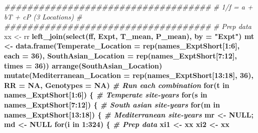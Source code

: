 \documentclass[
]{article}
\newenvironment{Shaded}{\begin{snugshade}}{\end{snugshade}}
\newcommand{\CommentTok}[1]{\textcolor[rgb]{0.56,0.35,0.01}{\textit{#1}}}
\newcommand{\ControlFlowTok}[1]{\textcolor[rgb]{0.13,0.29,0.53}{\textbf{#1}}}
\newcommand{\DataTypeTok}[1]{\textcolor[rgb]{0.13,0.29,0.53}{#1}}
\newcommand{\DecValTok}[1]{\textcolor[rgb]{0.00,0.00,0.81}{#1}}
\newcommand{\KeywordTok}[1]{\textcolor[rgb]{0.13,0.29,0.53}{\textbf{#1}}}
\newcommand{\NormalTok}[1]{#1}
\newcommand{\OperatorTok}[1]{\textcolor[rgb]{0.81,0.36,0.00}{\textbf{#1}}}
\newcommand{\OtherTok}[1]{\textcolor[rgb]{0.56,0.35,0.01}{#1}}
\newcommand{\StringTok}[1]{\textcolor[rgb]{0.31,0.60,0.02}{#1}}
\begin{document}
\begin{Shaded}
\begin{Highlighting}[]
\CommentTok{####################################}
\CommentTok{# 1/f = a + bT + cP (3 Locations) #}
\CommentTok{####################################}
\CommentTok{# Prep data}
\NormalTok{xx <-}\StringTok{ }\NormalTok{rr }\OperatorTok{%
\StringTok{  }\KeywordTok{left_join}\NormalTok{(}\KeywordTok{select}\NormalTok{(ff, Expt, T_mean, P_mean), }\DataTypeTok{by =} \StringTok{"Expt"}\NormalTok{)}
\NormalTok{mt <-}\StringTok{ }\KeywordTok{data.frame}\NormalTok{(}\DataTypeTok{Temperate_Location     =} \KeywordTok{rep}\NormalTok{(names_ExptShort[}\DecValTok{1}\OperatorTok{:}\DecValTok{6}\NormalTok{],  }\DataTypeTok{each =} \DecValTok{36}\NormalTok{),}
                 \DataTypeTok{SouthAsian_Location    =} \KeywordTok{rep}\NormalTok{(names_ExptShort[}\DecValTok{7}\OperatorTok{:}\DecValTok{12}\NormalTok{], }\DataTypeTok{times =} \DecValTok{36}\NormalTok{)) }\OperatorTok{%
\StringTok{  }\KeywordTok{arrange}\NormalTok{(SouthAsian_Location) }\OperatorTok{%
\StringTok{  }\KeywordTok{mutate}\NormalTok{(}\DataTypeTok{Mediterranean_Location =} \KeywordTok{rep}\NormalTok{(names_ExptShort[}\DecValTok{13}\OperatorTok{:}\DecValTok{18}\NormalTok{], }\DecValTok{36}\NormalTok{),}
                 \DataTypeTok{RR =} \OtherTok{NA}\NormalTok{, }\DataTypeTok{Genotypes =} \OtherTok{NA}\NormalTok{)}
\CommentTok{# Run each combination}
\ControlFlowTok{for}\NormalTok{(t }\ControlFlowTok{in}\NormalTok{ names_ExptShort[}\DecValTok{1}\OperatorTok{:}\DecValTok{6}\NormalTok{]) \{ }\CommentTok{# Temperate site-years}
  \ControlFlowTok{for}\NormalTok{(s }\ControlFlowTok{in}\NormalTok{ names_ExptShort[}\DecValTok{7}\OperatorTok{:}\DecValTok{12}\NormalTok{]) \{ }\CommentTok{# South asian site-years}
    \ControlFlowTok{for}\NormalTok{(m }\ControlFlowTok{in}\NormalTok{ names_ExptShort[}\DecValTok{13}\OperatorTok{:}\DecValTok{18}\NormalTok{]) \{ }\CommentTok{# Mediterranean site-years}
\NormalTok{      mr <-}\StringTok{ }\OtherTok{NULL}\NormalTok{; md <-}\StringTok{ }\OtherTok{NULL}
      \ControlFlowTok{for}\NormalTok{(i }\ControlFlowTok{in} \DecValTok{1}\OperatorTok{:}\DecValTok{324}\NormalTok{) \{}
        \CommentTok{# Prep data}
\NormalTok{        xi1 <-}\StringTok{ }\NormalTok{xx }\OperatorTok{%
\NormalTok{        xi2 <-}\StringTok{ }\NormalTok{xx }\OperatorTok{%
}}}}}
\end{Highlighting}
\end{Shaded}
\end{document}
